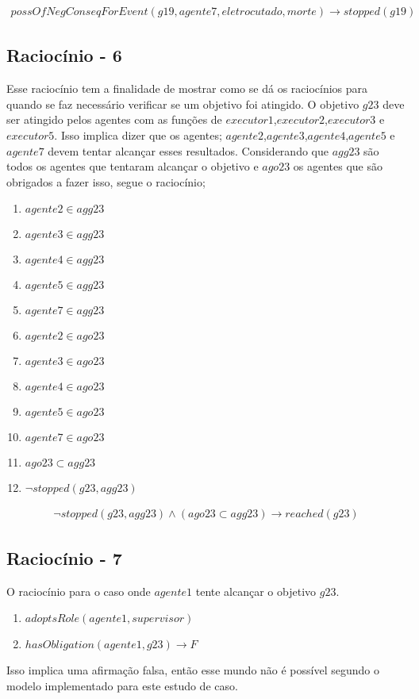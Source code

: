 \begin{eqnarray}
	possOfNegConseqForEvent(g19,agente7,eletrocutado,morte) \to stopped(g19)
\end{eqnarray}


\subsection{Raciocínio - 6}
\label{raciocinio6}
Esse raciocínio tem a finalidade de mostrar como se dá os raciocínios para quando se faz necessário verificar se um objetivo foi atingido. O objetivo $g23$ deve ser atingido pelos agentes com as funções de $executor1$,$executor2$,$executor3$ e $executor5$. Isso implica dizer que os agentes; $agente2$,$agente3$,$agente4$,$agente5$ e $agente7$ devem tentar alcançar esses resultados. Considerando que $agg23$ são todos os agentes que tentaram alcançar o objetivo e $ago23$ os agentes que são obrigados a fazer isso, segue o raciocínio;


\begin{enumerate}
	\item $agente2 \in agg23$	
	\item $agente3 \in agg23$
	\item $agente4 \in agg23$
	\item $agente5 \in agg23$
	\item $agente7 \in agg23$								
	\item $agente2 \in ago23$	
	\item $agente3 \in ago23$
	\item $agente4 \in ago23$
	\item $agente5 \in ago23$
	\item $agente7 \in ago23$	
	\item $ago23 \subset agg23$
	\item $\neg stopped(g23,agg23)$										
\end{enumerate}

\begin{eqnarray}\label{rel15}
	\neg stopped(g23,agg23) \wedge (ago23 \subset agg23) \to reached(g23)
\end{eqnarray}

\subsection{Raciocínio - 7}
\label{raciocinio7}
O raciocínio para o caso onde $agente1$ tente alcançar o objetivo $g23$.  

\begin{enumerate}
	\item $adoptsRole(agente1,supervisor)$
	\item $hasObligation(agente1,g23) \to F$										
\end{enumerate}

Isso implica uma afirmação falsa, então esse mundo não é possível segundo o modelo implementado para este estudo de caso.